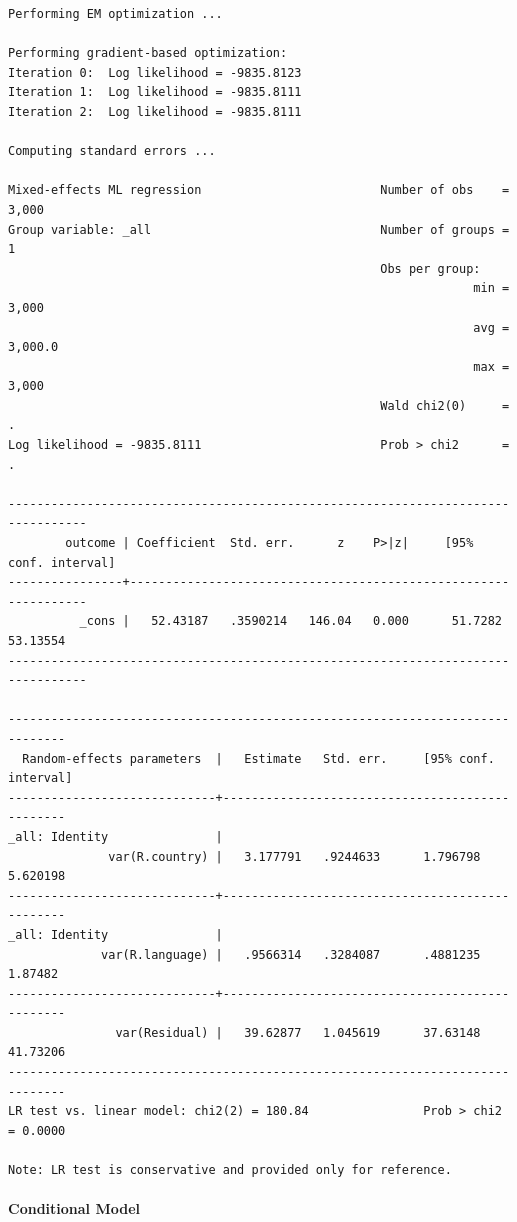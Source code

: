 \documentclass[
  letterpaper,
  DIV=11,
  numbers=noendperiod]{scrreprt}
\let\oldparagraph\paragraph
\renewcommand{\paragraph}[1]{\oldparagraph{#1}\mbox{}}
\begin{document}
\begin{verbatim}
Performing EM optimization ...

Performing gradient-based optimization: 
Iteration 0:  Log likelihood = -9835.8123  
Iteration 1:  Log likelihood = -9835.8111  
Iteration 2:  Log likelihood = -9835.8111  

Computing standard errors ...

Mixed-effects ML regression                         Number of obs    =   3,000
Group variable: _all                                Number of groups =       1
                                                    Obs per group:
                                                                 min =   3,000
                                                                 avg = 3,000.0
                                                                 max =   3,000
                                                    Wald chi2(0)     =       .
Log likelihood = -9835.8111                         Prob > chi2      =       .

---------------------------------------------------------------------------------
        outcome | Coefficient  Std. err.      z    P>|z|     [95% conf. interval]
----------------+----------------------------------------------------------------
          _cons |   52.43187   .3590214   146.04   0.000      51.7282    53.13554
---------------------------------------------------------------------------------

------------------------------------------------------------------------------
  Random-effects parameters  |   Estimate   Std. err.     [95% conf. interval]
-----------------------------+------------------------------------------------
_all: Identity               |
              var(R.country) |   3.177791   .9244633      1.796798    5.620198
-----------------------------+------------------------------------------------
_all: Identity               |
             var(R.language) |   .9566314   .3284087      .4881235     1.87482
-----------------------------+------------------------------------------------
               var(Residual) |   39.62877   1.045619      37.63148    41.73206
------------------------------------------------------------------------------
LR test vs. linear model: chi2(2) = 180.84                Prob > chi2 = 0.0000

Note: LR test is conservative and provided only for reference.
\end{verbatim}

\paragraph{Conditional Model}\label{conditional-model-3}
\end{document}
